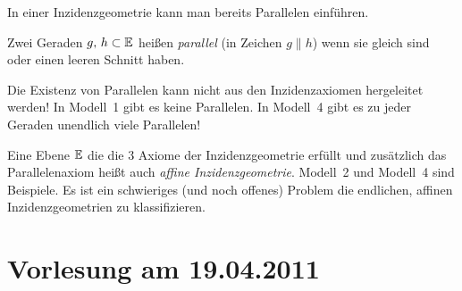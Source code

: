 \bigskip


In einer Inzidenzgeometrie kann man bereits Parallelen einführen.

\begin{defi}[Parallelit\"{a}t]
Zwei Geraden $g,\,h \subset \mathbb E$ heißen {\em parallel} (in Zeichen $g\|h$)
wenn sie gleich sind oder einen leeren Schnitt haben.
\end{defi}

Die Existenz von Parallelen kann nicht aus den Inzidenzaxiomen
hergeleitet werden! In Modell~1 gibt es keine Parallelen. In Modell~4
gibt es zu jeder Geraden unendlich viele Parallelen!







Eine Ebene $\mathbb E$ die die 3 Axiome der Inzidenzgeometrie erfüllt und
zusätzlich das Parallelenaxiom heißt auch {\em affine Inzidenzgeometrie}.
Modell~2 und Modell~4 sind Beispiele. Es ist ein schwieriges (und
noch offenes) Problem die endlichen, affinen Inzidenzgeometrien zu
klassifizieren.

%








\section*{Vorlesung am 19.04.2011}



